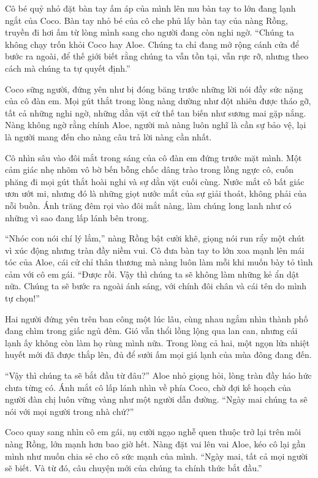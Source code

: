 ﻿\documentclass[../main.tex]{subfiles}
\begin{document}
Cô bé quỷ nhỏ đặt bàn tay ấm áp của mình lên mu bàn tay to lớn đang lạnh ngắt của Coco. Bàn tay nhỏ bé của cô che phủ lấy bàn tay của nàng Rồng, truyền đi hơi ấm từ lòng mình sang cho người đang còn nghi ngờ. ``Chúng ta không chạy trốn khỏi Coco hay Aloe. Chúng ta chỉ đang mở rộng cánh cửa để bước ra ngoài, để thế giới biết rằng chúng ta vẫn tồn tại, vẫn rực rỡ, nhưng theo cách mà chúng ta tự quyết định.''

Coco sững người, đứng yên như bị đóng băng trước những lời nói đầy sức nặng của cô đàn em. Mọi gút thắt trong lòng nàng dường như đột nhiên được tháo gỡ, tất cả những nghi ngờ, những dằn vặt cứ thế tan biến như sương mai gặp nắng. Nàng không ngờ rằng chính Aloe, người mà nàng luôn nghĩ là cần sự bảo vệ, lại là người mang đến cho nàng câu trả lời nàng cần nhất.

Cô nhìn sâu vào đôi mắt trong sáng của cô đàn em đứng trước mặt mình. Một cảm giác nhẹ nhõm vô bờ bến bỗng chốc dâng trào trong lồng ngực cô, cuốn phăng đi mọi gút thắt hoài nghi và sự dằn vặt cuối cùng. Nước mắt cô bất giác ươn ướt mi, nhưng đó là những giọt nước mắt của sự giải thoát, không phải của nỗi buồn. Ánh trăng đêm rọi vào đôi mắt nàng, làm chúng long lanh như có những vì sao đang lấp lánh bên trong.

``Nhóc con nói chí lý lắm,'' nàng Rồng bật cười khẽ, giọng nói run rẩy một chút vì xúc động nhưng tràn đầy niềm vui. Cô đưa bàn tay to lớn xoa mạnh lên mái tóc của Aloe, cái cử chỉ thân thương mà nàng luôn làm mỗi khi muốn bày tỏ tình cảm với cô em gái. ``Được rồi. Vậy thì chúng ta sẽ không làm những kẻ ẩn dật nữa. Chúng ta sẽ bước ra ngoài ánh sáng, với chính đôi chân và cái tên do mình tự chọn!''

Hai người đứng yên trên ban công một lúc lâu, cùng nhau ngắm nhìn thành phố đang chìm trong giấc ngủ đêm. Gió vẫn thổi lồng lộng qua lan can, nhưng cái lạnh ấy không còn làm họ rùng mình nữa. Trong lòng cả hai, một ngọn lửa nhiệt huyết mới đã được thắp lên, đủ để sưởi ấm mọi giá lạnh của mùa đông đang đến.

``Vậy thì chúng ta sẽ bắt đầu từ đâu?'' Aloe nhỏ giọng hỏi, lòng tràn đầy háo hức chưa từng có. Ánh mắt cô lấp lánh nhìn về phía Coco, chờ đợi kế hoạch của người đàn chị luôn vững vàng như một người dẫn đường. ``Ngày mai chúng ta sẽ nói với mọi người trong nhà chứ?''

Coco quay sang nhìn cô em gái, nụ cười ngạo nghễ quen thuộc trở lại trên môi nàng Rồng, lớn mạnh hơn bao giờ hết. Nàng đặt vai lên vai Aloe, kéo cô lại gần mình như muốn chia sẻ cho cô sức mạnh của mình. ``Ngày mai, tất cả mọi người sẽ biết. Và từ đó, câu chuyện mới của chúng ta chính thức bắt đầu.''
\end{document}
